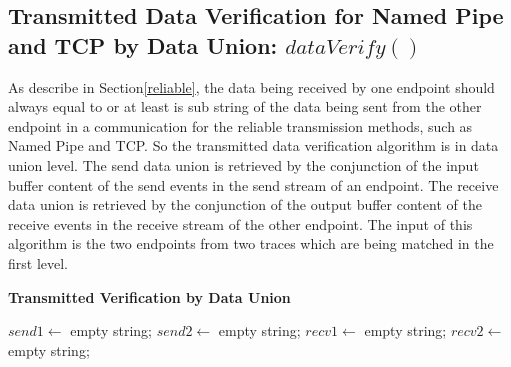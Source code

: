 \subsection{Transmitted Data Verification for Named Pipe and TCP by Data Union: $dataVerify()$}
As describe in Section\ref{reliable}, the data being received by one endpoint should always equal to or at least is sub string of the data being sent from the other endpoint in a communication for the reliable transmission methods, such as Named Pipe and TCP. So the transmitted data verification algorithm is in data union level. The send data union is retrieved by the conjunction of the input buffer content of the send events in the send stream of an endpoint. The receive data union is retrieved by the conjunction of the output buffer content of the receive events in the receive stream of the other endpoint. The input of this algorithm is the two endpoints from two traces which are being matched in the first level.
\begin{algorithm}[H]
\DontPrintSemicolon
\caption{{\bf Transmitted Verification by Data Union} \label{dataAlg1}}
$send1 \leftarrow$ empty string;\;
$send2 \leftarrow$ empty string;\;
$recv1 \leftarrow$ empty string;\;
$recv2 \leftarrow$ empty string;\;

\end{algorithm} 

